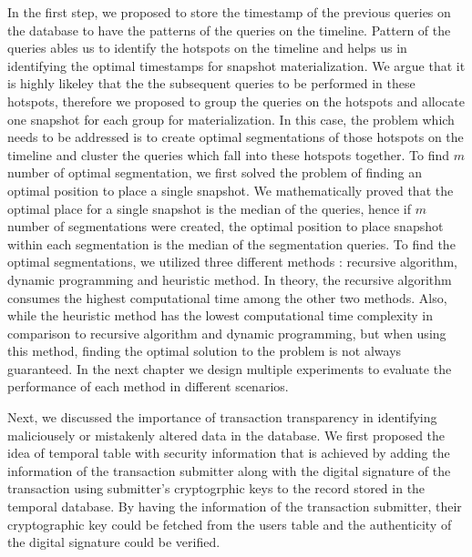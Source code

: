 		In the first step, we proposed to store the timestamp of the previous queries on the database to have the patterns of the queries on the timeline. Pattern of the queries ables us to identify the hotspots on the timeline and helps us in identifying the optimal timestamps for snapshot materialization. We argue that it is highly likeley that the the subsequent queries to be performed in these hotspots, therefore we proposed to group the queries on the hotspots and allocate one snapshot for each group for materialization. In this case, the problem which needs to be addressed is to create optimal segmentations of those hotspots on the timeline and cluster the queries which fall into these hotspots together.
		To find $m$ number of optimal segmentation, we first solved the problem of finding an optimal position to place a single snapshot. We mathematically proved that the optimal place for a single snapshot is the median of the queries, hence if $m$ number of segmentations were created, the optimal position to place snapshot within each segmentation is the median of the segmentation queries. To find the optimal segmentations, we utilized three different methods : recursive algorithm, dynamic programming and heuristic method. In theory, the recursive algorithm consumes the highest computational time among the other two methods. Also, while the heuristic method has the lowest computational time complexity in comparison to recursive algorithm and dynamic programming, but when using this method, finding the optimal solution to the problem is not always guaranteed. In the next chapter we design multiple experiments to evaluate the performance of each method in different scenarios.

		Next, we discussed the importance of transaction transparency in identifying maliciousely or mistakenly altered data in the database. We first proposed the idea of temporal table with security information that is achieved by adding the information of the transaction submitter along with the digital signature of the transaction using submitter's cryptogrphic keys to the record stored in the temporal database. By having the information of the transaction submitter, their cryptographic key could be fetched from the users table and the authenticity of the digital signature could be verified.

